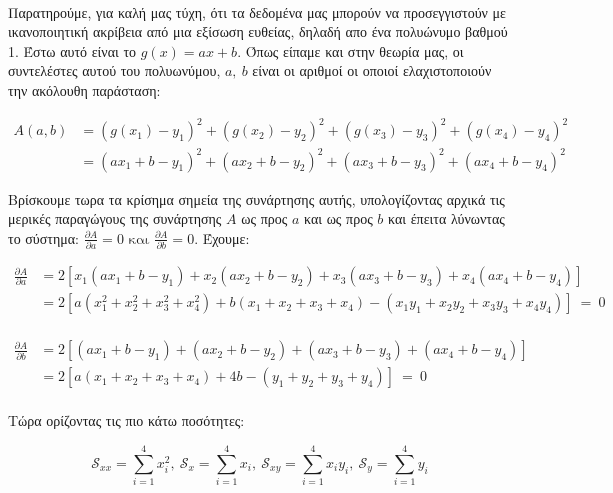 \documentclass[12pt]{article}
\begin{document}
    \begin{center}
    \end{center}
    { \hspace*{\fill} \\}
    
    Παρατηρούμε, για καλή μας τύχη, ότι τα δεδομένα μας μπορούν να
προσεγγιστούν με ικανοποιητική ακρίβεια από μια εξίσωση ευθείας, δηλαδή
απο ένα πολυώνυμο βαθμού 1. Έστω αυτό είναι το \(g(x)=ax+b\). Όπως
είπαμε και στην θεωρία μας, οι συντελέστες αυτού του πολυωνύμου,
\(a, \ b\) είναι οι αριθμοί οι οποιοί ελαχιστοποιούν την ακόλουθη
παράσταση:

\begin{align*}
A(a,b) &= (g(x_1)-y_1)^2+(g(x_2)-y_2)^2+(g(x_3)-y_3)^2+(g(x_4)-y_4)^2 \nonumber \\
       &= (ax_1+b-y_1)^2+(ax_2+b-y_2)^2+(ax_3+b-y_3)^2+(ax_4+b-y_4)^2 
\end{align*}

Βρίσκουμε τωρα τα κρίσημα σημεία της συνάρτησης αυτής, υπολογίζοντας
αρχικά τις μερικές παραγώγους της συνάρτησης \(A\) ως προς \(a\) και ως
προς \(b\) και έπειτα λύνωντας το σύστημα:
\(\frac{\partial A}{\partial a}=0 \text{ και } \frac{\partial A}{\partial b}=0\).
Έχουμε:

\begin{align}
\frac{\partial A}{\partial a} &= 2[x_1(ax_1+b-y_1)+x_2(ax_2+b-y_2)+x_3(ax_3+b-y_3)+x_4(ax_4+b-y_4)] \nonumber \\
                              &= 2[a(x_1^2+x_2^2+x_3^2+x_4^2)+b(x_1+x_2+x_3+x_4)-(x_1y_1+x_2y_2+x_3y_3+x_4y_4)] \ = \ 0 \nonumber \\ \tag{Ex. 1.1} \label{eq:10}
\end{align}

\begin{align}
\frac{\partial A}{\partial b} &= 2[(ax_1+b-y_1)+(ax_2+b-y_2)+(ax_3+b-y_3)+(ax_4+b-y_4)] \nonumber \\
                              &= 2[a(x_1+x_2+x_3+x_4)+4b-(y_1+y_2+y_3+y_4)] \ = \ 0 \nonumber \\
\tag{Ex. 1.2} \label{eq:11}
\end{align}

Tώρα ορίζοντας τις πιο κάτω ποσότητες:

\[
\mathcal{S}_{xx}=\sum_{i=1}^4x_i^2, \ \mathcal{S}_{x}=\sum_{i=1}^4x_i, \ \mathcal{S}_{xy}=\sum_{i=1}^4x_iy_i, \ \mathcal{S}_{y}=\sum_{i=1}^4y_i \nonumber
\]
\end{document}
